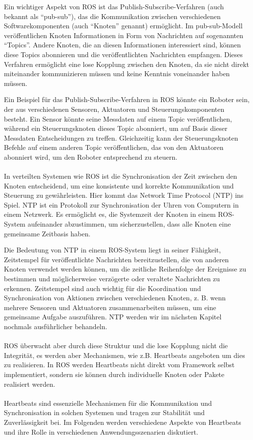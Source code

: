Ein wichtiger Aspekt von ROS ist das Publish-Subscribe-Verfahren (auch bekannt als \enquote{pub-sub}), das die Kommunikation zwischen verschiedenen Softwarekomponenten (auch \enquote{Knoten} genannt) ermöglicht. Im pub-sub-Modell veröffentlichen Knoten Informationen in Form von Nachrichten auf sogenannten \enquote{Topics}. Andere Knoten, die an diesen Informationen interessiert sind, können diese Topics abonnieren und die veröffentlichten Nachrichten empfangen. Dieses Verfahren ermöglicht eine lose Kopplung zwischen den Knoten, da sie nicht direkt miteinander kommunizieren müssen und keine Kenntnis voneinander haben müssen.

Ein Beispiel für das Publish-Subscribe-Verfahren in ROS könnte ein Roboter sein, der aus verschiedenen Sensoren, Aktuatoren und Steuerungskomponenten besteht. Ein Sensor könnte seine Messdaten auf einem Topic veröffentlichen, während ein Steuerungsknoten dieses Topic abonniert, um auf Basis dieser Messdaten Entscheidungen zu treffen. Gleichzeitig kann der Steuerungsknoten Befehle auf einem anderen Topic veröffentlichen, das von den Aktuatoren abonniert wird, um den Roboter entsprechend zu steuern.
\\\\
In verteilten Systemen wie ROS ist die Synchronisation der Zeit zwischen den Knoten entscheidend, um eine konsistente und korrekte Kommunikation und Steuerung zu gewährleisten. Hier kommt das Network Time Protocol (NTP) ins Spiel. NTP ist ein Protokoll zur Synchronisation der Uhren von Computern in einem Netzwerk. Es ermöglicht es, die Systemzeit der Knoten in einem ROS-System aufeinander abzustimmen, um sicherzustellen, dass alle Knoten eine gemeinsame Zeitbasis haben.

Die Bedeutung von NTP in einem ROS-System liegt in seiner Fähigkeit, Zeitstempel für veröffentlichte Nachrichten bereitzustellen, die von anderen Knoten verwendet werden können, um die zeitliche Reihenfolge der Ereignisse zu bestimmen und möglicherweise verzögerte oder veraltete Nachrichten zu erkennen. Zeitstempel sind auch wichtig für die Koordination und Synchronisation von Aktionen zwischen verschiedenen Knoten, z. B. wenn mehrere Sensoren und Aktuatoren zusammenarbeiten müssen, um eine gemeinsame Aufgabe auszuführen. NTP werden wir im nächsten Kapitel nochmals ausführlicher behandeln. 
\\\\
ROS überwacht aber durch diese Struktur und die lose Kopplung nicht die Integrität, es werden aber Mechanismen, wie z.B. Heartbeats angeboten um dies zu realisieren.  In ROS werden Heartbeats nicht direkt vom Framework selbst implementiert, sondern sie können durch individuelle Knoten oder Pakete realisiert werden.
\\\\
Heartbeats sind essenzielle Mechanismen für die Kommunikation und Synchronisation in solchen Systemen und tragen zur Stabilität und Zuverlässigkeit bei. Im Folgenden werden verschiedene Aspekte von Heartbeats und ihre Rolle in verschiedenen Anwendungsszenarien diskutiert. 

